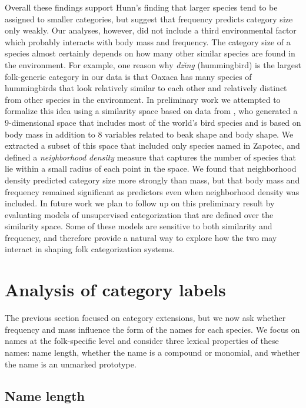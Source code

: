 \documentclass[10pt,letterpaper]{article}
\begin{document}
Overall these findings support Hunn's finding that larger species tend to be assigned to smaller categories, but suggest that frequency predicts category size only weakly. Our analyses, however,  did not include a third environmental factor  which probably interacts with body mass and frequency. The category size of a species almost certainly depends on how many other similar species are found in the environment. For example, one reason why \textit{dz\v{\i}n\b{g}} (hummingbird) is the largest folk-generic category in our data is that Oaxaca has many species of hummingbirds that look relatively similar to each other and relatively distinct from other species in the environment. In preliminary work we attempted to formalize this idea using a similarity space based on data from \cite{pigot}, who generated a 9-dimensional space that includes most of the world's bird species and is based on body mass in addition to 8 variables related to beak shape and body shape. We extracted a subset of this space that included only species named in Zapotec, and defined a \emph{neighborhood density} measure that captures the number of species that lie within a small radius of each point in the space. We found that neighborhood density predicted category size more strongly than mass, but that body mass and frequency remained significant as predictors even when neighborhood density was included. In future work we plan to follow up on this preliminary result by evaluating models of unsupervised categorization that are defined over the similarity space. Some of these models are sensitive to both similarity and frequency, and therefore provide a natural way to explore how the two may interact in shaping folk categorization systems.

\section{Analysis of category labels}

The previous section focused on category extensions, but we now ask whether frequency and mass influence the form of the names for each species. We focus on names at the folk-specific level and consider three lexical properties of these names: name length, whether the name is a compound or monomial, and whether the name is an unmarked prototype.

\subsection{Name length}
\end{document}

